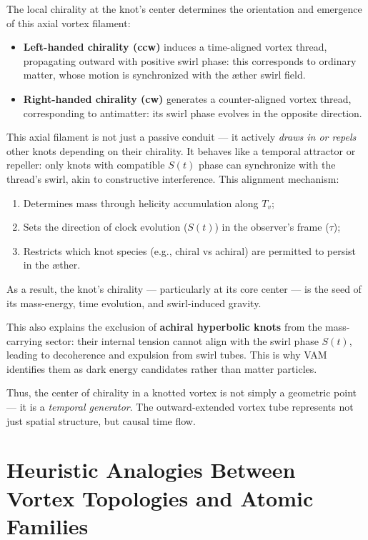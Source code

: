 \documentclass[a4paper,12pt]{article}
\begin{document}
The local chirality at the knot’s center determines the orientation and emergence of this axial vortex filament:
\begin{itemize}
    \item \textbf{Left-handed chirality (ccw)} induces a time-aligned vortex thread, propagating outward with positive swirl phase: this corresponds to ordinary matter, whose motion is synchronized with the æther swirl field.
    \item \textbf{Right-handed chirality (cw)} generates a counter-aligned vortex thread, corresponding to antimatter: its swirl phase evolves in the opposite direction.
\end{itemize}

\noindent This axial filament is not just a passive conduit — it actively \textit{draws in or repels} other knots depending on their chirality. It behaves like a temporal attractor or repeller: only knots with compatible $S(t)$ phase can synchronize with the thread’s swirl, akin to constructive interference. This alignment mechanism:
\begin{enumerate}
    \item Determines mass through helicity accumulation along $T_v$;
    \item Sets the direction of clock evolution ($S(t)$) in the observer's frame ($\tau$);
    \item Restricts which knot species (e.g., chiral vs achiral) are permitted to persist in the æther.
\end{enumerate}

As a result, the knot’s chirality — particularly at its core center — is the seed of its mass-energy, time evolution, and swirl-induced gravity.

This also explains the exclusion of \textbf{achiral hyperbolic knots} from the mass-carrying sector: their internal tension cannot align with the swirl phase $S(t)$, leading to decoherence and expulsion from swirl tubes. This is why VAM identifies them as dark energy candidates rather than matter particles.

Thus, the center of chirality in a knotted vortex is not simply a geometric point — it is a \textit{temporal generator}. The outward-extended vortex tube represents not just spatial structure, but causal time flow.

\section{Heuristic Analogies Between Vortex Topologies and Atomic Families}
\end{document}

